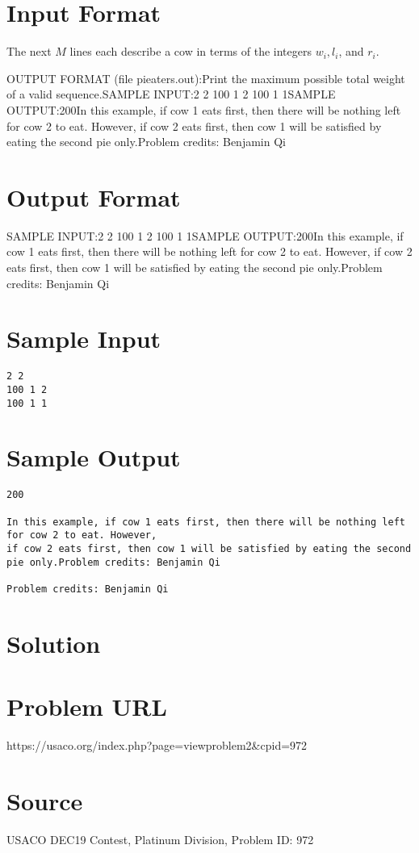 \documentclass[12pt]{article}
\begin{document}
\section*{Input Format}
The next $M$ lines each describe a cow in terms of the integers $w_i, l_i$, and $r_i$.

OUTPUT FORMAT (file pieaters.out):Print the maximum possible total weight of a valid sequence.SAMPLE INPUT:2 2
100 1 2
100 1 1SAMPLE OUTPUT:200In this example, if cow 1 eats first, then there will be nothing left for cow 2 to eat. However,
if cow 2 eats first, then cow 1 will be satisfied by eating the second pie only.Problem credits: Benjamin Qi

\section*{Output Format}
SAMPLE INPUT:2 2
100 1 2
100 1 1SAMPLE OUTPUT:200In this example, if cow 1 eats first, then there will be nothing left for cow 2 to eat. However,
if cow 2 eats first, then cow 1 will be satisfied by eating the second pie only.Problem credits: Benjamin Qi

\section*{Sample Input}
\begin{verbatim}
2 2
100 1 2
100 1 1
\end{verbatim}

\section*{Sample Output}
\begin{verbatim}
200

In this example, if cow 1 eats first, then there will be nothing left for cow 2 to eat. However,
if cow 2 eats first, then cow 1 will be satisfied by eating the second pie only.Problem credits: Benjamin Qi

Problem credits: Benjamin Qi
\end{verbatim}

\section*{Solution}


\section*{Problem URL}
https://usaco.org/index.php?page=viewproblem2&cpid=972

\section*{Source}
USACO DEC19 Contest, Platinum Division, Problem ID: 972
\end{document}
